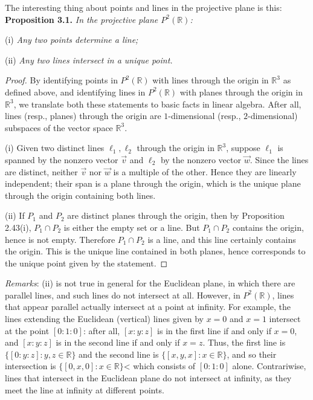 \documentclass[leqno]{book}
\begin{document}
The interesting thing about points and lines in the projective plane is this:\\

\noindent\textbf{Proposition 3.1.} \emph{In the projective plane $P^2(\mathbb R)$:}

(i) \emph{Any two points determine a line;}

(ii) \emph{Any two lines intersect in a unique point.}
\begin{proof}
By identifying points in $P^2(\mathbb R)$ with lines through the origin in $\mathbb R^3$ as defined above, and identifying lines in $P^2(\mathbb R)$ with planes through the origin in $\mathbb R^3$, we translate both these statements to basic facts in linear algebra.  After all, lines (resp., planes) through the origin are $1$-dimensional (resp., $2$-dimensional) subspaces of the vector space $\mathbb R^3$.

(i) Given two distinct lines $\ell_1,\ell_2$ through the origin in $\mathbb R^3$, suppose $\ell_1$ is spanned by the nonzero vector $\vec v$ and $\ell_2$ by the nonzero vector $\vec w$.  Since the lines are distinct, neither $\vec v$ nor $\vec w$ is a multiple of the other.  Hence they are linearly independent; their span is a plane through the origin, which is the unique plane through the origin containing both lines.

(ii) If $P_1$ and $P_2$ are distinct planes through the origin, then by Proposition 2.43(i), $P_1\cap P_2$ is either the empty set or a line.  But $P_1\cap P_2$ contains the origin, hence is not empty.  Therefore $P_1\cap P_2$ is a line, and this line certainly contains the origin.  This is the unique line contained in both planes, hence corresponds to the unique point given by the statement.
\end{proof}

\noindent\emph{Remarks}: (ii) is not true in general for the Euclidean plane, in which there are parallel lines, and such lines do not intersect at all.  However, in $P^2(\mathbb R)$, lines that appear parallel actually intersect at a point at infinity.  For example, the lines extending the Euclidean (vertical) lines given by $x=0$ and $x=1$ intersect at the point $[0:1:0]$: after all, $[x:y:z]$ is in the first line if and only if $x=0$, and $[x:y:z]$ is in the second line if and only if $x=z$.  Thus, the first line is $\{[0:y:z]:y,z\in\mathbb R\}$ and the second line is $\{[x,y,x]:x\in\mathbb R\}$, and so their intersection is $\{[0,x,0]:x\in\mathbb R\}$< which consists of $[0:1:0]$ alone.  Contrariwise, lines that intersect in the Euclidean plane do not intersect at infinity, as they meet the line at infinity at different points.
\end{document}
